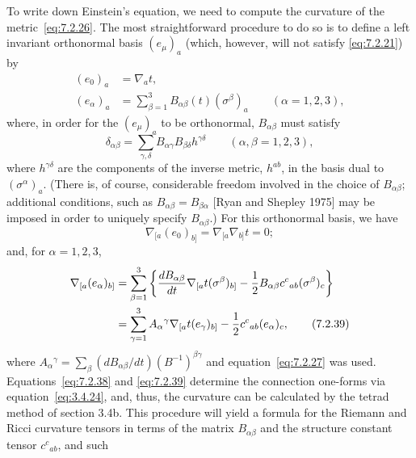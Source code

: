 To write down Einstein's equation, we need to compute the curvature of the
metric~\eqref{eq:7.2.26}. The most straightforward procedure to do so is to define
a left invariant orthonormal basis \((e_\mu)_a\) (which, however, will not satisfy
\eqref{eq:7.2.21}) by
\begin{align}
  (e_0)_a&=\nabla_at ,
  \tag{7.2.35}\label{eq:7.2.35}\\
  (e_\alpha)_a&=\sum_{\beta=1}^{3}
    B_{\alpha\beta}(t)(\sigma^\beta)_a
    \qquad(\alpha=1,2,3) ,
  \tag{7.2.36}\label{eq:7.2.36}
\end{align}
where, in order for the \((e_\mu)_a\) to be orthonormal, \(B_{\alpha\beta}\)
must satisfy
\begin{equation}
  \delta_{\alpha\beta}
    =\sum_{\gamma,\delta}
      B_{\alpha\gamma}B_{\beta\delta}h^{\gamma\delta}
    \qquad(\alpha,\beta=1,2,3) ,
  \tag{7.2.37}\label{eq:7.2.37}
\end{equation}
where \(h^{\gamma\delta}\) are the components of the inverse metric, \(h^{ab}\),
in the basis dual to \((\sigma^\alpha)_a\). (There is, of course, considerable
freedom involved in the choice of \(B_{\alpha\beta}\); additional conditions, such
as \(B_{\alpha\beta}=B_{\beta\alpha}\) [Ryan and Shepley 1975] may be imposed in
order to uniquely specify \(B_{\alpha\beta}\).) For this orthonormal basis, we have
\begin{equation}
  \nabla_{[a}(e_0)_{b]}=\nabla_{[a}\nabla_{b]}t=0 ;
  \tag{7.2.38}\label{eq:7.2.38}
\end{equation}
and, for \(\alpha=1,2,3\),
\begin{align}
  \nabla_{[a}(e_\alpha)_{b]}
    &=\sum_{\beta=1}^{3}
      \left\{
        \frac{dB_{\alpha\beta}}{dt}
          \nabla_{[a}t(\sigma^\beta)_{b]}
        -\frac12B_{\alpha\beta}c^c{}_{ab}(\sigma^\beta)_c
      \right\} \notag\\
    &=\sum_{\gamma=1}^{3}
      A_\alpha{}^\gamma\nabla_{[a}t(e_\gamma)_{b]}
      -\frac12c^c{}_{ab}(e_\alpha)_c ,
  \tag{7.2.39}\label{eq:7.2.39}
\end{align}
where
\(A_\alpha{}^\gamma
  =\sum_\beta(dB_{\alpha\beta}/dt)(B^{-1})^{\beta\gamma}\)
and equation~\eqref{eq:7.2.27} was used.
Equations~\eqref{eq:7.2.38} and \eqref{eq:7.2.39} determine the connection
one-forms via equation~\eqref{eq:3.4.24}, and, thus, the curvature can be
calculated by the tetrad method of section 3.4b. This procedure will yield a formula
for the Riemann and Ricci curvature tensors in terms of the matrix
\(B_{\alpha\beta}\) and the structure constant tensor \(c^c{}_{ab}\), and such
